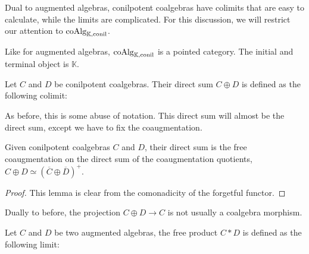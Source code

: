 \documentclass[../thesis.tex]{subfiles}
\begin{document}
                Dual to augmented algebras, conilpotent coalgebras have colimits that are easy to calculate, while the limits are complicated. For this discussion, we will restrict our attention to $\tt{coAlg}_{\mathbb{K},\tt{conil}}$.

                Like for augmented algebras, $\tt{coAlg}_{\mathbb{K},\tt{conil}}$ is a pointed category. The initial and terminal object is $\mathbb{K}$.

                \begin{definition}
                    Let $C$ and $D$ be conilpotent coalgebras. Their direct sum $C \oplus D$ is defined as the following colimit:
                    \begin{center}
                    \end{center}
                \end{definition}

                As before, this is some abuse of notation. This direct sum will almost be the direct sum, except we have to fix the coaugmentation.

                \begin{lemma}
                    Given conilpotent coalgebras $C$ and $D$, their direct sum is the free coaugmentation on the direct sum of the coaugmentation quotients, $C \oplus D \simeq (\overline{C} \oplus \overline{D})^+$.
                \end{lemma}

                \begin{proof}
                    This lemma is clear from the comonadicity of the forgetful functor.
                \end{proof}

                Dually to before, the projection $C \oplus D \rightarrow C$ is not usually a coalgebra morphism.

                \begin{definition}
                    Let $C$ and $D$ be two augmented algebras, the free product $C \ast D$ is defined as the following limit:
                    \begin{center}
                    \end{center}
                \end{definition}
\end{document}
